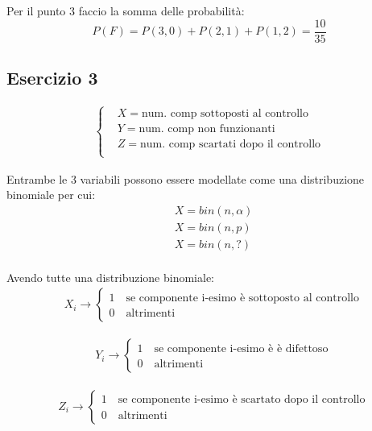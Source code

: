 \documentclass[12pt]{article}
\begin{document}
Per il punto 3 faccio la somma delle probabilità:
\[
P(F) = P(3,0) + P(2,1) + P(1,2) = \frac{10}{35}    
\]
\subsection*{Esercizio 3}
\begin{align*}
    \begin{cases}
        &X = \text{num. comp sottoposti al controllo} \\
        &Y = \text{num. comp non funzionanti} \\
        &Z = \text{num. comp scartati dopo il controllo} \\
    \end{cases}
\end{align*}

Entrambe le 3 variabili possono essere modellate come una distribuzione binomiale per cui:
\begin{align*}
    &X = bin(n,\alpha) \\
    &X = bin(n,p) \\
    &X = bin(n,?) \\
\end{align*}

Avendo tutte una distribuzione binomiale:
\begin{align*}
    &X_i \rightarrow
    \begin{cases}
        1 \quad \text{se componente i-esimo è sottoposto al controllo} \\
        0 \quad \text{altrimenti}
    \end{cases}
\end{align*}

\begin{align*}
    &Y_i \rightarrow
    \begin{cases}
        1 \quad \text{se componente i-esimo è è difettoso} \\
        0 \quad \text{altrimenti}
    \end{cases}
\end{align*}

\begin{align*}
    &Z_i \rightarrow
    \begin{cases}
        1 \quad \text{se componente i-esimo è scartato dopo il controllo} \\
        0 \quad \text{altrimenti}
    \end{cases}
\end{align*}
\end{document}
